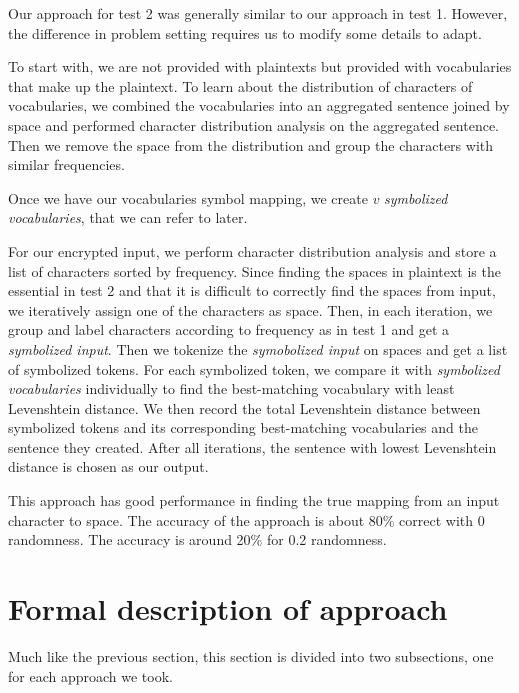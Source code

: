 \documentclass[12pt]{article}
\begin{document}
Our approach for test 2 was generally similar to our approach in test 1. However, the difference in problem setting requires us to modify some details to adapt.

To start with, we are not provided with plaintexts but provided with vocabularies that make up the plaintext. To learn about the distribution of characters of vocabularies, we combined the vocabularies into an aggregated sentence joined by space and performed character distribution analysis on the aggregated sentence. Then we remove the space from the distribution and group the characters with similar frequencies. 

Once we have our vocabularies symbol mapping, we create $v$ \emph{symbolized vocabularies}, that we can refer to later.

For our encrypted input, we perform character distribution analysis and store a list of characters sorted by frequency. Since finding the spaces in plaintext is the essential in test 2 and that it is difficult to correctly find the spaces from input, we iteratively assign one of the characters as space. Then, in each iteration, we group and label characters according to frequency as in test 1 and get a \emph{symbolized input}. Then we tokenize the \emph{symobolized input} on spaces and get a list of symbolized tokens. For each symbolized token, we compare it with \emph{symbolized vocabularies} individually to find the best-matching vocabulary with least Levenshtein distance. We then record the total Levenshtein distance between symbolized tokens and its corresponding best-matching vocabularies and the sentence they created. After all iterations, the sentence with lowest Levenshtein distance is chosen as our output.

This approach has good performance in finding the true mapping from an input character to space. The accuracy of the approach is about 80\% correct with 0 randomness. The accuracy is around 20\% for 0.2 randomness.


\section{Formal description of approach}
Much like the previous section, this section is divided into two subsections, one for each approach we took.
\end{document}
